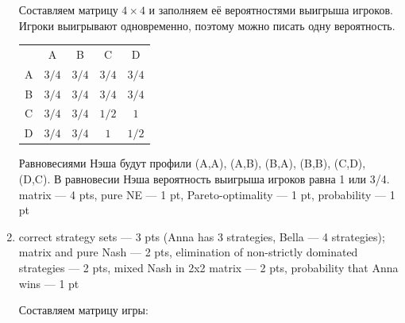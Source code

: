 \documentclass[12pt]{article} %
\theoremstyle{definition} %
\begin{document}
\begin{enumerate}
Составляем матрицу $4\times 4$ и заполняем её вероятностями выигрыша игроков. Игроки выигрывают одновременно, поэтому можно писать одну вероятность.

\begin{tabular}{ccccc}
 & A & B & C & D \\
A & $3/4$ & $3/4$ & $3/4$ & $3/4$ \\
B & $3/4$ & $3/4$ & $3/4$ & $3/4$ \\
C & $3/4$ & $3/4$ & $1/2$ & $1$ \\
D & $3/4$ & $3/4$ & $1$ & $1/2$ \\
\end{tabular}


 Равновесиями Нэша будут профили (A,A), (A,B), (B,A), (B,B), (C,D), (D,C). В равновесии Нэша вероятность выигрыша игроков равна 1 или 3/4.
matrix --- 4 pts, pure NE --- 1 pt, Pareto-optimality --- 1 pt, probability --- 1 pt


\item correct strategy sets --- 3 pts (Anna has 3 strategies, Bella --- 4 strategies); matrix and pure Nash --- 2 pts, elimination of non-strictly dominated strategies --- 2 pts, mixed Nash in 2x2 matrix --- 2 pts, probability that Anna wins --- 1 pt

Составляем матрицу игры:


\end{enumerate}
\end{document}
